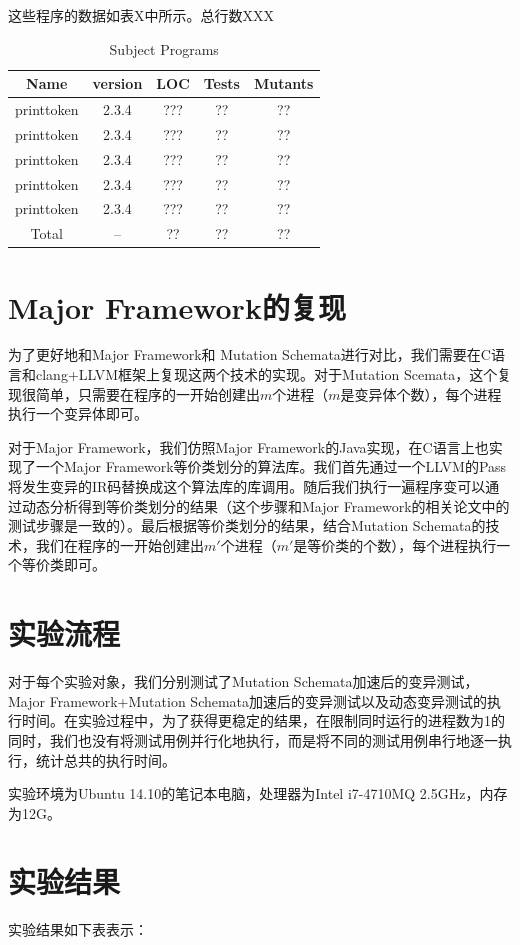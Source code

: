 \documentclass[nofonts]{ctexrep}
\begin{document}
这些程序的数据如表X中所示。总行数XXX

\begin{table}[t]
  \centering
  \caption{Subject Programs}
  \label{tab:subjects}
  \begin{tabular}{|c|c|c|c|c|}
    \hline
    Name & version & LOC & Tests & Mutants\\
    \hline
    printtoken & 2.3.4 & ??? & ?? & ??\\
    printtoken & 2.3.4 & ??? & ?? & ??\\
    printtoken & 2.3.4 & ??? & ?? & ??\\
    printtoken & 2.3.4 & ??? & ?? & ??\\
    printtoken & 2.3.4 & ??? & ?? & ??\\
    \hline
    Total & -- &?? &??& ??\\
    \hline
  \end{tabular}
\end{table}
\section{Major Framework的复现}
为了更好地和Major Framework和 Mutation Schemata进行对比，我们需要在C语言和clang+LLVM框架上复现这两个技术的实现。对于Mutation Scemata，这个复现很简单，只需要在程序的一开始创建出$m$个进程（$m$是变异体个数），每个进程执行一个变异体即可。

对于Major Framework，我们仿照Major Framework的Java实现，在C语言上也实现了一个Major Framework等价类划分的算法库。我们首先通过一个LLVM的Pass将发生变异的IR码替换成这个算法库的库调用。随后我们执行一遍程序变可以通过动态分析得到等价类划分的结果（这个步骤和Major Framework的相关论文中的测试步骤是一致的）。最后根据等价类划分的结果，结合Mutation Schemata的技术，我们在程序的一开始创建出$m'$个进程（$m'$是等价类的个数），每个进程执行一个等价类即可。

\section{实验流程}
对于每个实验对象，我们分别测试了Mutation Schemata加速后的变异测试，Major Framework+Mutation Schemata加速后的变异测试以及动态变异测试的执行时间。在实验过程中，为了获得更稳定的结果，在限制同时运行的进程数为1的同时，我们也没有将测试用例并行化地执行，而是将不同的测试用例串行地逐一执行，统计总共的执行时间。

实验环境为Ubuntu 14.10的笔记本电脑，处理器为Intel i7-4710MQ 2.5GHz，内存为12G。
\section{实验结果}
实验结果如下表表示：
\end{document}
